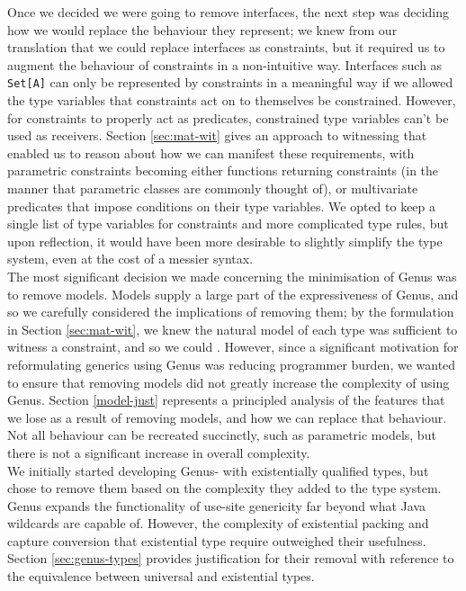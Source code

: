 Once we decided we were going to remove interfaces, the next step was deciding how we would replace the behaviour they represent; we knew from our translation that we could replace interfaces as constraints, but it required us to augment the behaviour of constraints in a non-intuitive way. Interfaces such as \texttt{Set[A]} can only be represented by constraints in a meaningful way if we allowed the type variables that constraints act on to themselves be constrained. However, for constraints to properly act as predicates, constrained type variables can't be used as receivers. Section \ref{sec:mat-wit} gives an approach to witnessing that enabled us to reason about how we can manifest these requirements, with parametric constraints becoming either functions returning constraints (in the manner that parametric classes are commonly thought of), or multivariate predicates that impose conditions on their type variables. We opted to keep a single list of type variables for constraints and more complicated type rules, but upon reflection, it would have been more desirable to slightly simplify the type system, even at the cost of a messier syntax. \\

The most significant decision we made concerning the minimisation of Genus was to remove models. Models supply a large part of the expressiveness of Genus, and so we carefully considered the implications of removing them; by the formulation in Section \ref{sec:mat-wit}, we knew the natural model of each type was sufficient to witness a constraint, and so we could . However, since a significant motivation for reformulating generics using Genus was reducing programmer burden, we wanted to ensure that removing models did not greatly increase the complexity of using Genus. Section \ref{model-just} represents a principled analysis of the features that we lose as a result of removing models, and how we can replace that behaviour. Not all behaviour can be recreated succinctly, such as parametric models, but there is not a significant increase in overall complexity. \\

We initially started developing Genus- with existentially qualified types, but chose to remove them based on the complexity they added to the type system. Genus expands the functionality of use-site genericity far beyond what Java wildcards are capable of. However, the complexity of existential packing and capture conversion that existential type require outweighed their usefulness. Section \ref{sec:genus-types} provides justification for their removal with reference to the equivalence between universal and existential types. 

